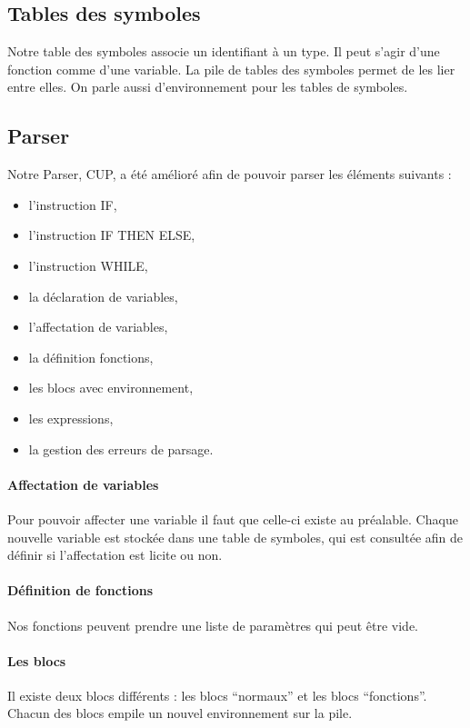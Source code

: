 \documentclass[a4paper,oneside]{article}
\begin{document}
\subsection{Tables des symboles}
Notre table des symboles associe un identifiant à un type. Il peut s'agir d'une fonction comme d'une variable. La pile de tables des symboles permet de les lier entre elles. On parle aussi d'environnement pour les tables de symboles. 

\subsection{Parser}
Notre Parser, CUP, a été amélioré afin de pouvoir parser les éléments suivants : \\
\begin{itemize}
\item l'instruction IF,
\item l'instruction IF THEN ELSE,
\item l'instruction WHILE,
\item la déclaration de variables,
\item l'affectation de variables,
\item la définition fonctions,
\item les blocs avec environnement,
\item les expressions,
\item la gestion des erreurs de parsage.
\end{itemize}
  \paragraph {Affectation de variables}
  Pour pouvoir affecter une variable il faut que celle-ci existe au préalable. Chaque nouvelle variable est stockée dans une table de symboles, qui est consultée afin de définir si l'affectation est licite ou non.

  \paragraph {Définition de fonctions}
  Nos fonctions peuvent prendre une liste de paramètres qui peut être vide.

  \paragraph{Les blocs}
  Il existe deux blocs différents : les blocs ``normaux'' et les blocs ``fonctions''. Chacun des blocs empile un nouvel environnement sur la pile.
\end{document}
